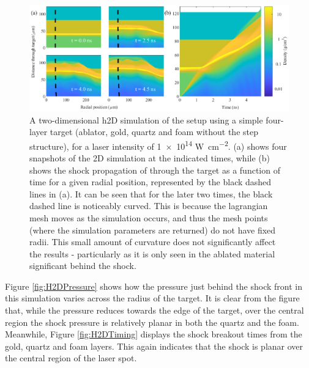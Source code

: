 \begin{figure}[hbt!]
\centering
\includegraphics[width=1\textwidth]{figures/Experiment/H2DPlot.eps}%
\caption{\label{fig:H2DPlot} A two-dimensional h2D simulation of the setup using a simple four-layer target (ablator, gold, quartz and foam without the step structure), for a laser intensity of \num{1e14} \unit{\W\per\centi\meter\squared}. (a) shows four snapshots of the 2D simulation at the indicated times, while (b) shows the shock propagation of through the target as a function of time for a given radial position, represented by the black dashed lines in (a). It can be seen that for the later two times, the black dashed line is noticeably curved. This is because the lagrangian mesh moves as the simulation occurs, and thus the mesh points (where the simulation parameters are returned) do not have fixed radii. This small amount of curvature does not significantly affect the results - particularly as it is only seen in the ablated material significant behind the shock.}
\end{figure}

Figure \ref{fig:H2DPressure} shows how the pressure just behind the shock front in this simulation varies across the radius of the target. It is clear from the figure that, while the pressure reduces towards the edge of the target, over the central region the shock pressure is relatively planar in both the quartz and the foam. Meanwhile, Figure \ref{fig:H2DTiming} displays the shock breakout times from the gold, quartz and foam layers. This again indicates that the shock is planar over the central region of the laser spot.

